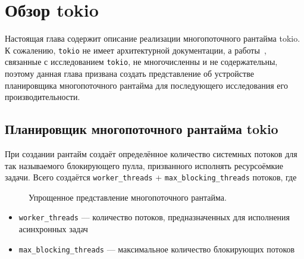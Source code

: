 
\section{Обзор tokio}

Настоящая глава содержит описание реализации многопоточного рантайма tokio. К сожалению, \verb|tokio| не имеет архитектурной документации, а работы~\cite{cringeTokioIOUring}, связанные с исследованием \verb|tokio|, не многочисленны и не содержательны, поэтому данная глава призвана создать представление об устройстве планировщика многопоточного рантайма для последующего исследования его производительности.

\subsection{Планировщик многопоточного рантайма tokio}

При создании рантайм создаёт определённое количество системных потоков для так называемого блокирующего пулла, призванного исполнять ресурсоёмкие задачи. Всего создаётся \verb|worker_threads| + \verb|max_blocking_threads| потоков, где

\begin{figure}[H]
    \begin{center}
    \end{center}

    \caption{Упрощенное представление многопоточного рантайма.}
    \label{fig:tokio:arch}
\end{figure}

\begin{itemize}
    \item \verb|worker_threads| --- количество потоков, предназначенных для исполнения асинхронных задач
    \item \verb|max_blocking_threads| --- максимальное количество блокирующих потоков
\end{itemize}

